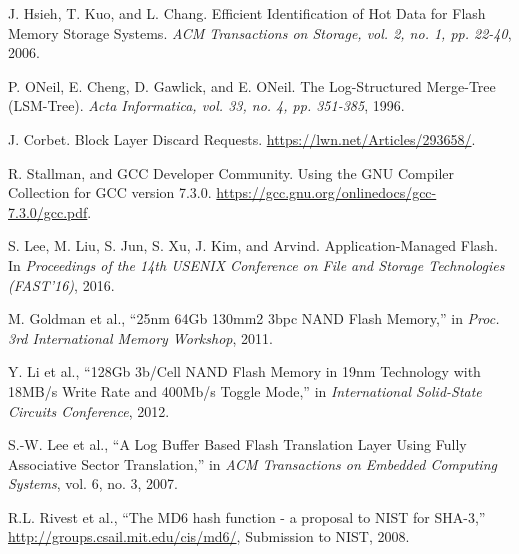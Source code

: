 \begin{thebibliography}{00}
J. Hsieh, T. Kuo, and L. Chang.
Efficient Identification of Hot Data for Flash Memory Storage Systems.
\textit{ACM Transactions on Storage, vol. 2, no. 1, pp. 22-40}, 2006.

P. ONeil, E. Cheng, D. Gawlick, and E. ONeil.
The Log-Structured Merge-Tree (LSM-Tree).
\textit{Acta Informatica, vol. 33, no. 4, pp. 351-385}, 1996.

J. Corbet.
Block Layer Discard Requests.
\url{https://lwn.net/Articles/293658/}.

R. Stallman, and GCC Developer Community.
Using the GNU Compiler Collection for GCC version 7.3.0.
\url{https://gcc.gnu.org/onlinedocs/gcc-7.3.0/gcc.pdf}.


S. Lee, M. Liu, S. Jun, S. Xu, J. Kim, and Arvind.
Application-Managed Flash.
In \textit{Proceedings of the 14th USENIX Conference on File and Storage
Technologies (FAST'16)}, 2016.


M. Goldman et al.,
``25nm 64Gb 130mm2 3bpc NAND Flash Memory,''
in \textit{Proc. 3rd International Memory Workshop}, 2011.


Y. Li et al.,
``128Gb 3b/Cell NAND Flash Memory in 19nm Technology with 18MB/s Write Rate and 400Mb/s Toggle Mode,''
in \textit{International Solid-State Circuits Conference}, 2012.


S.-W. Lee et al.,
``A Log Buffer Based Flash Translation Layer Using Fully Associative Sector Translation,''
in \textit{ACM Transactions on Embedded Computing Systems}, vol. 6, no. 3, 2007.


R.L. Rivest et al.,
``The MD6 hash function - a proposal to NIST for SHA-3,''
\url{http://groups.csail.mit.edu/cis/md6/}, Submission to NIST, 2008.


\end{thebibliography}
